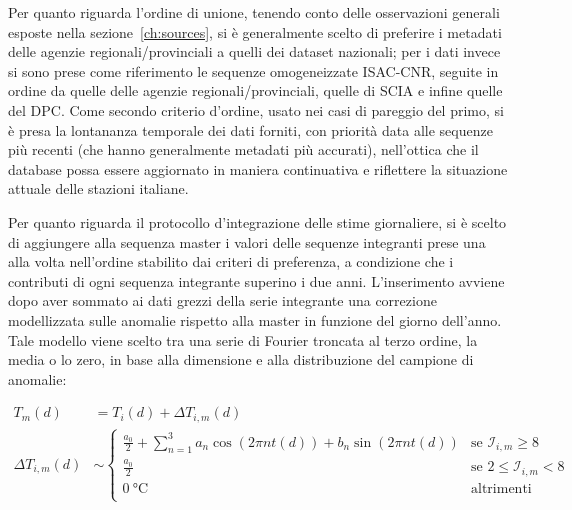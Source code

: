 Per quanto riguarda l'ordine di unione, tenendo conto delle osservazioni generali esposte nella sezione~\ref{ch:sources}, si è generalmente scelto di preferire i metadati delle agenzie regionali/provinciali a quelli dei dataset nazionali; per i dati invece si sono prese come riferimento le sequenze omogeneizzate ISAC-CNR, seguite in ordine da quelle delle agenzie regionali/provinciali, quelle di SCIA e infine quelle del DPC. Come secondo criterio d'ordine, usato nei casi di pareggio del primo, si è presa la lontananza temporale dei dati forniti, con priorità data alle sequenze più recenti (che hanno generalmente metadati più accurati), nell'ottica che il database possa essere aggiornato in maniera continuativa e riflettere la situazione attuale delle stazioni italiane.

Per quanto riguarda il protocollo d'integrazione delle stime giornaliere, si è scelto di aggiungere alla sequenza master i valori delle sequenze integranti prese una alla volta nell'ordine stabilito dai criteri di preferenza, a condizione che i contributi di ogni sequenza integrante superino i due anni.
L'inserimento avviene dopo aver sommato ai dati grezzi della serie integrante una correzione modellizzata sulle anomalie rispetto alla master in funzione del giorno dell'anno. Tale modello viene scelto tra una serie di Fourier troncata al terzo ordine, la media o lo zero, in base alla dimensione e alla distribuzione del campione di anomalie:

\begin{align*}
  T_m(d) &= T_i(d) + \Delta T_{i,m}(d) \\
  \Delta T_{i,m}(d) &\sim
  \begin{cases}
    \frac{a_0}{2} + \sum^3_{n=1} a_n \cos( 2\pi n t(d)) + b_n\sin(2\pi n t(d)) & \text{se } \mathcal{I}_{i,m} \ge 8 \\
    \frac{a_0}{2} & \text{se } 2 \le \mathcal{I}_{i,m} < 8 \\
    \qty{0}{\degreeCelsius} & \text{altrimenti} \\
  \end{cases}
\end{align*}

